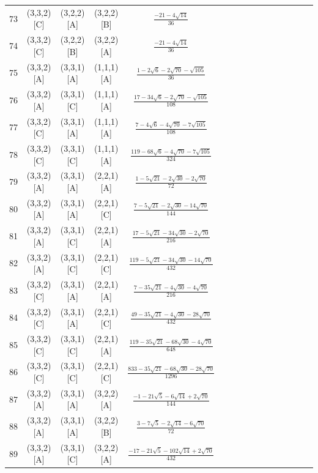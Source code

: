 \documentclass[11pt]{article}
\begin{document}
\begin{longtable}{ | p{1cm}| *{15}{c|} }
73 & (3,3,2)[C] & (3,2,2)[A] & (3,2,2)[B] & $\frac{-21-4\sqrt{14}}{36}$\\ %
74 & (3,3,2)[C] & (3,2,2)[B] & (3,2,2)[A] & $\frac{-21-4\sqrt{14}}{36}$\\ %
75 & (3,3,2)[A] & (3,3,1)[A] & (1,1,1)[A] & $\frac{1-2\sqrt{6}-2\sqrt{70}-\sqrt{105}}{36}$\\ %
76 & (3,3,2)[A] & (3,3,1)[C] & (1,1,1)[A] & $\frac{17-34\sqrt{6}-2\sqrt{70}-\sqrt{105}}{108}$\\ %
77 & (3,3,2)[C] & (3,3,1)[A] & (1,1,1)[A] & $\frac{7-4\sqrt{6}-4\sqrt{70}-7\sqrt{105}}{108}$\\ %
78 & (3,3,2)[C] & (3,3,1)[C] & (1,1,1)[A] & $\frac{119-68\sqrt{6}-4\sqrt{70}-7\sqrt{105}}{324}$\\ %
79 & (3,3,2)[A] & (3,3,1)[A] & (2,2,1)[A] & $\frac{1-5\sqrt{21}-2\sqrt{30}-2\sqrt{70}}{72}$\\ %
80 & (3,3,2)[A] & (3,3,1)[A] & (2,2,1)[C] & $\frac{7-5\sqrt{21}-2\sqrt{30}-14\sqrt{70}}{144}$\\ %
81 & (3,3,2)[A] & (3,3,1)[C] & (2,2,1)[A] & $\frac{17-5\sqrt{21}-34\sqrt{30}-2\sqrt{70}}{216}$\\ %
82 & (3,3,2)[A] & (3,3,1)[C] & (2,2,1)[C] & $\frac{119-5\sqrt{21}-34\sqrt{30}-14\sqrt{70}}{432}$\\ %
83 & (3,3,2)[C] & (3,3,1)[A] & (2,2,1)[A] & $\frac{7-35\sqrt{21}-4\sqrt{30}-4\sqrt{70}}{216}$\\ %
84 & (3,3,2)[C] & (3,3,1)[A] & (2,2,1)[C] & $\frac{49-35\sqrt{21}-4\sqrt{30}-28\sqrt{70}}{432}$\\ %
85 & (3,3,2)[C] & (3,3,1)[C] & (2,2,1)[A] & $\frac{119-35\sqrt{21}-68\sqrt{30}-4\sqrt{70}}{648}$\\ %
86 & (3,3,2)[C] & (3,3,1)[C] & (2,2,1)[C] & $\frac{833-35\sqrt{21}-68\sqrt{30}-28\sqrt{70}}{1296}$\\ %
87 & (3,3,2)[A] & (3,3,1)[A] & (3,2,2)[A] & $\frac{-1-21\sqrt{5}-6\sqrt{14}+2\sqrt{70}}{144}$\\ %
88 & (3,3,2)[A] & (3,3,1)[A] & (3,2,2)[B] & $\frac{3-7\sqrt{5}-2\sqrt{14}-6\sqrt{70}}{72}$\\ %
89 & (3,3,2)[A] & (3,3,1)[C] & (3,2,2)[A] & $\frac{-17-21\sqrt{5}-102\sqrt{14}+2\sqrt{70}}{432}$\\ %

\end{longtable}
\end{document}
